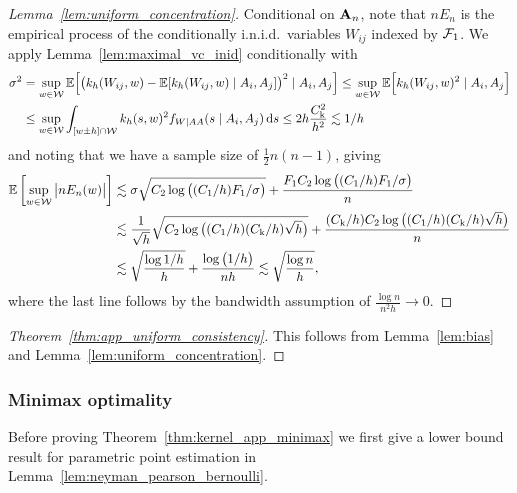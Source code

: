\begin{proof}[Lemma~\ref{lem:uniform_concentration}]

  Conditional on $\mathbf{A}_n$,
  note that $n E_n$
  is the empirical process of the conditionally
  i.n.i.d.\ variables $W_{i j}$
  indexed by $\mathcal{F}_1$.
  We apply Lemma~\ref{lem:maximal_vc_inid}
  conditionally with
  \begin{align*}
    \sigma^2
    &=
    \sup_{w \in \mathcal{W}}
    \mathbb{E}\Big[
      \big(
        k_h(W_{i j},w)
        - \mathbb{E}[k_h(W_{i j},w) \mid A_i, A_j]
      \big)^2
      \mid A_i, A_j
    \Big]
    \leq
    \sup_{w \in \mathcal{W}}
    \mathbb{E}\Big[
      k_h(W_{i j},w)^2
      \mid A_i, A_j
    \Big] \\
    &\leq
    \sup_{w \in \mathcal{W}}
    \int_{[w \pm h] \cap \mathcal{W}}
    k_h(s,w)^2
    f_{W \mid AA}(s \mid A_i, A_j)
    \,\mathrm{d}s
    \leq 2h \frac{C_\mathrm{k}^2}{h^2}
    \lesssim 1/h
  \end{align*}
  and noting that we have
  a sample size of
  $\frac{1}{2}n(n-1)$,
  giving
  \begin{align*}
    \mathbb{E} \left[
      \sup_{w \in \mathcal{W}}
      \big| n E_n(w) \big|
    \right]
    &\lesssim
    \sigma
    \sqrt{C_2 \log \big((C_1/h) F_1 / \sigma \big)}
    +
    \frac{F_1 C_2 \log \big((C_1/h) F_1 / \sigma\big)}
    {n} \\
    &\lesssim
    \frac{1}{\sqrt h}
    \sqrt{C_2 \log \big((C_1/h) (C_\mathrm{k}/h) \sqrt h \big)}
    +
    \frac{(C_\mathrm{k}/h) C_2 \log \big((C_1/h) (C_\mathrm{k}/h) \sqrt h \big)}
    {n} \\
    &\lesssim
    \sqrt{\frac{\log 1/h}{h}}
    +
    \frac{\log \big(1/h\big)}
    {n h}
    \lesssim
    \sqrt{\frac{\log n}{h}},
  \end{align*}
  where the last line follows by the bandwidth assumption
  of $\frac{\log n}{n^2h} \to 0$.
\end{proof}

\begin{proof}[Theorem~\ref{thm:app_uniform_consistency}]

  This follows from Lemma~\ref{lem:bias}
  and Lemma~\ref{lem:uniform_concentration}.
\end{proof}

\subsubsection{Minimax optimality}

Before proving Theorem~\ref{thm:kernel_app_minimax}
we first give a lower bound result
for parametric point estimation in
Lemma~\ref{lem:neyman_pearson_bernoulli}.

